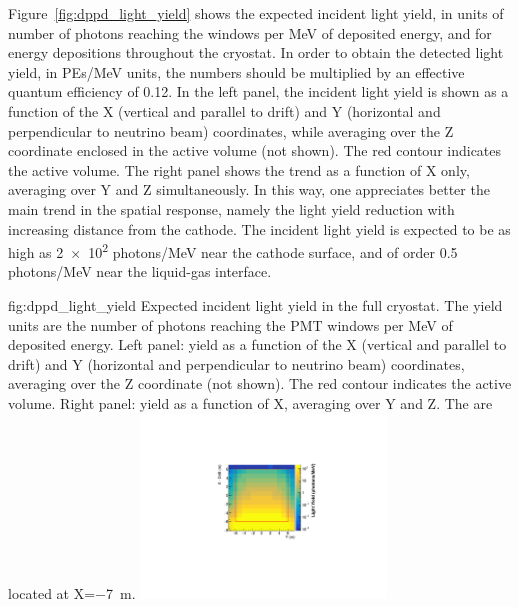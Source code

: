
Figure~\ref{fig:dppd_light_yield} shows the expected incident light yield, in units of number of photons reaching the  windows per MeV of deposited energy, and for energy depositions throughout the   cryostat. In order to obtain the detected light yield, in PEs/MeV units, the numbers should be multiplied by an effective quantum efficiency of 0.12. In the left panel, the incident light yield is shown as a function of the X (vertical and parallel to drift) and Y (horizontal and perpendicular to neutrino beam) coordinates, while averaging over the Z coordinate enclosed in the  active volume (not shown). The red contour indicates the  active volume. The right panel shows the trend as a function of X only, averaging over Y and Z simultaneously. In this way, one appreciates better the main trend in the spatial response, namely the light yield reduction with increasing distance from the cathode. The incident light yield is expected to be as high as \num{2e2} photons/\si{\MeV} near the cathode surface, and of order \num{0.5} photons/\si{\MeV} near the liquid-gas interface. 

\begin{dunefigure}{fig:dppd_light_yield}
     {Expected incident light yield in the full   cryostat. The yield units are the number of photons reaching the PMT windows per \si{\MeV} of deposited energy. Left panel: yield as a function of the X (vertical and parallel to drift) and Y (horizontal and perpendicular to neutrino beam) coordinates, averaging over the Z coordinate (not shown). The red contour indicates the  active volume. Right panel: yield as a function of X, averaging over Y and Z. The  are located at X=\SI{-7}{\m}.}
    \includegraphics[width=0.49\textwidth]{graphics/dppd_light_yield_2D.pdf} \hfill
    \end{dunefigure}

